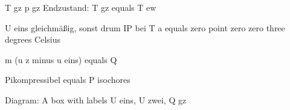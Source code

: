 T gz p gz Endzustand: T gz equals T ew

U eins gleichmäßig, sonst drum IP bei T a equals zero point zero zero three degrees Celsius

m (u z minus u eins) equals Q

Pikompressibel equals P isochores

Diagram: A box with labels U eins, U zwei, Q gz